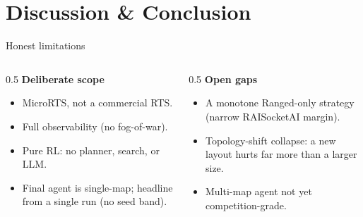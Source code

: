 \documentclass[aspectratio=169,11pt]{beamer}
\begin{document}
\section{Discussion \& Conclusion}

\begin{frame}{Honest limitations}
  \begin{columns}[T]
    \begin{column}{0.5\textwidth}
      {\bfseries\color{uclBlue}Deliberate scope}\\[3pt]
      \begin{itemize}\small\setlength\itemsep{5pt}
        \item MicroRTS, not a commercial RTS.
        \item Full observability (no fog-of-war).
        \item Pure RL: no planner, search, or LLM.
        \item Final agent is \alert{single-map}; headline from a single run
              (no seed band).
      \end{itemize}
    \end{column}
    \begin{column}{0.5\textwidth}
      {\bfseries\color{uclBlue}Open gaps}\\[3pt]
      \begin{itemize}\small\setlength\itemsep{5pt}
        \item A monotone \alert{Ranged-only} strategy (narrow RAISocketAI
              margin).
        \item \alert{Topology-shift collapse}: a new layout hurts far more
              than a larger size.
        \item Multi-map agent not yet \alert{competition-grade}.
      \end{itemize}
    \end{column}
  \end{columns}
\end{frame}
\end{document}
